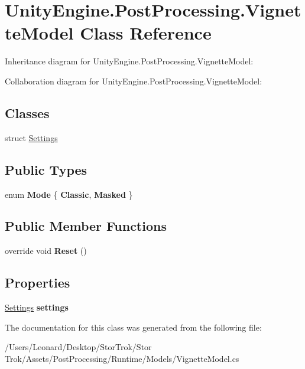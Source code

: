 \hypertarget{class_unity_engine_1_1_post_processing_1_1_vignette_model}{}\section{Unity\+Engine.\+Post\+Processing.\+Vignette\+Model Class Reference}
\label{class_unity_engine_1_1_post_processing_1_1_vignette_model}


Inheritance diagram for Unity\+Engine.\+Post\+Processing.\+Vignette\+Model\+:


Collaboration diagram for Unity\+Engine.\+Post\+Processing.\+Vignette\+Model\+:
\subsection*{Classes}
\begin{DoxyCompactItemize}
\item 
struct \hyperlink{struct_unity_engine_1_1_post_processing_1_1_vignette_model_1_1_settings}{Settings}
\end{DoxyCompactItemize}
\subsection*{Public Types}
\begin{DoxyCompactItemize}
\item 
\mbox{\label{class_unity_engine_1_1_post_processing_1_1_vignette_model_a98eb04307bcb3c902a1189d324a2f53d}} 
enum {\bfseries Mode} \{ {\bfseries Classic}, 
{\bfseries Masked}
 \}
\end{DoxyCompactItemize}
\subsection*{Public Member Functions}
\begin{DoxyCompactItemize}
\item 
\mbox{\label{class_unity_engine_1_1_post_processing_1_1_vignette_model_a7598645b887ddf177a33787cd06ca751}} 
override void {\bfseries Reset} ()
\end{DoxyCompactItemize}
\subsection*{Properties}
\begin{DoxyCompactItemize}
\item 
\mbox{\label{class_unity_engine_1_1_post_processing_1_1_vignette_model_a9bf7faa890c766df24f80fb30f62e761}} 
\hyperlink{struct_unity_engine_1_1_post_processing_1_1_vignette_model_1_1_settings}{Settings} {\bfseries settings}
\end{DoxyCompactItemize}


The documentation for this class was generated from the following file\+:\begin{DoxyCompactItemize}
\item 
/\+Users/\+Leonard/\+Desktop/\+Stor\+Trok/\+Stor Trok/\+Assets/\+Post\+Processing/\+Runtime/\+Models/Vignette\+Model.\+cs\end{DoxyCompactItemize}
